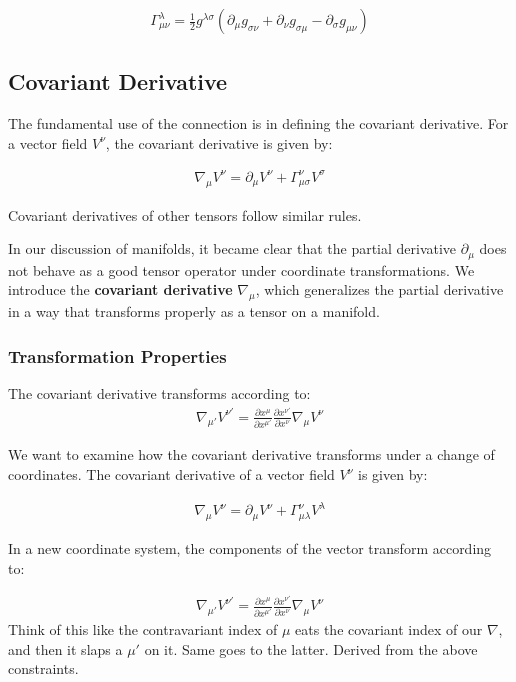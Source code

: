 \documentclass[11pt,letterpaper]{book}
\begin{document}
\begin{align}
\Gamma^\lambda_{\mu\nu} = \frac{1}{2}g^{\lambda\sigma}\left( \partial_\mu g_{\sigma\nu} + \partial_\nu g_{\sigma\mu} - \partial_\sigma g_{\mu\nu} \right)
\end{align}

\subsection{Covariant Derivative}
The fundamental use of the connection is in defining the covariant derivative. For a vector field \(V^\nu\), the covariant derivative is given by:

\begin{align}
\nabla_\mu V^\nu = \partial_\mu V^\nu + \Gamma^\nu_{\mu\sigma} V^\sigma
\end{align}

Covariant derivatives of other tensors follow similar rules. 

In our discussion of manifolds, it became clear that the partial derivative \(\partial_\mu\) does not behave as a good tensor operator under coordinate transformations. We introduce the \textbf{covariant derivative} \(\nabla_\mu\), which generalizes the partial derivative in a way that transforms properly as a tensor on a manifold.

\subsubsection{Transformation Properties}
The covariant derivative transforms according to:
\begin{align}
\nabla_{\mu'} V^{\nu'} = \frac{\partial x^\mu}{\partial x^{\mu'}} \frac{\partial x^{\nu'}}{\partial x^\nu} \nabla_\mu V^\nu
\end{align}

We want to examine how the covariant derivative transforms under a change of coordinates. The covariant derivative of a vector field \( V^\nu \) is given by:

\begin{align}
\nabla_\mu V^\nu = \partial_\mu V^\nu + \Gamma^\nu_{\mu\lambda} V^\lambda
\end{align}

In a new coordinate system, the components of the vector transform according to:

\begin{align}
\nabla_{\mu'} V^{\nu'} = \frac{\partial x^\mu}{\partial x^{\mu'}} \frac{\partial x^{\nu'}}{\partial x^\nu} \nabla_\mu V^\nu
\end{align}
Think of this like the contravariant index of $\mu$ eats the covariant index of our $\nabla$, and then it slaps a $\mu'$ on it. Same goes to the latter. Derived from the above constraints. 
\end{document}
